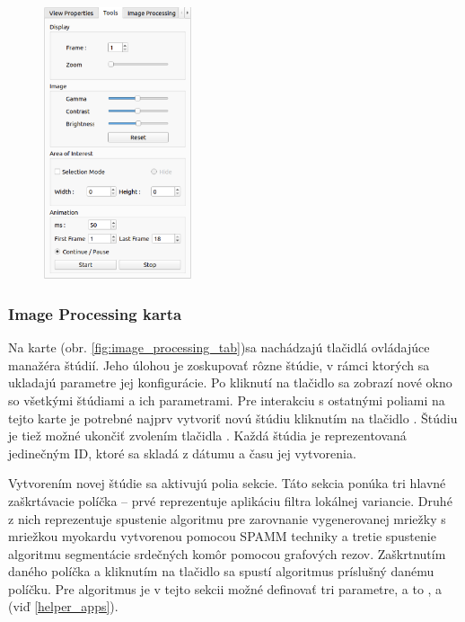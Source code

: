 {\begin {figure}[H]
        \centering
        \includegraphics[height=8cm]{media/existing_app/tabs/tools.png}
        \captionsetup{justification=centering}
        \label{fig:tools_tab}
\end {figure}

\clearpage

\subsubsection {Image Processing karta}\label{image_processing_tab}
Na  karte (obr. \ref{fig:image_processing_tab})sa nachádzajú tlačidlá ovládajúce manažéra štúdií. Jeho úlohou je zoskupovať rôzne štúdie, v rámci ktorých sa ukladajú parametre jej konfigurácie. Po kliknutí na tlačidlo  sa zobrazí nové okno so všetkými štúdiami a ich parametrami. Pre interakciu s ostatnými poliami na tejto karte je potrebné najprv vytvoriť novú štúdiu kliknutím na tlačidlo . Štúdiu je tiež možné ukončiť zvolením tlačidla . Každá štúdia je reprezentovaná jedinečným ID, ktoré sa skladá z dátumu a času jej vytvorenia.

Vytvorením novej štúdie sa aktivujú polia  sekcie. Táto sekcia ponúka tri hlavné zaškrtávacie políčka -- prvé reprezentuje aplikáciu filtra lokálnej variancie. Druhé z nich reprezentuje spustenie algoritmu pre zarovnanie vygenerovanej mriežky s mriežkou myokardu vytvorenou pomocou SPAMM techniky a tretie spustenie algoritmu segmentácie srdečných komôr pomocou grafových rezov. Zaškrtnutím daného políčka a kliknutím na tlačidlo  sa spustí algoritmus príslušný danému políčku. Pre  algoritmus je v tejto sekcii možné definovať tri parametre, a to ,  a  (viď \ref{helper_apps}).

}
